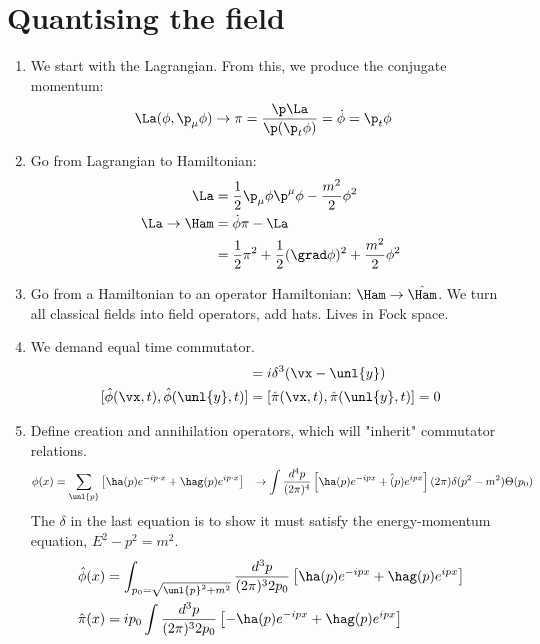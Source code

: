 \documentclass[a4paper, 11pt, normalem]{report}
\newcommand\hphi{\hat{\phi}}
\newcommand\hpi{\hat{\pi}}
\newcommand\vy{\unl{y}}
\begin{document}
\section{Quantising the field}
\begin{enumerate}
    \item We start with the Lagrangian.
        From this, we produce the conjugate momentum:
        \begin{align}
            \La(\phi,\p_\mu\phi) \to \pi &= \frac{\p\La}{\p(\p_t\phi)} = \dot{\phi} = \p_t\phi
        \end{align}
    \item Go from Lagrangian to Hamiltonian:
        \begin{align}
            \La &= \frac12 \p_\mu\phi\p^\mu\phi - \frac{m^2}{2}\phi^2 \\
            \La \to \Ham &= \dot{\phi}\pi - \La \\
                        &= \frac12\pi^2 + \frac12(\grad\phi)^2 + \frac{m^2}{2}\phi^2
        \end{align}
    \item Go from a Hamiltonian to an operator Hamiltonian: $\Ham \to \hat{\Ham}$.
        We turn all classical fields into field operators, add hats.
        Lives in Fock space.
    \item We demand equal time commutator.
        \begin{align}
            [\hphi(\vx,t),\hpi(\vy,t)] &= i\delta^3(\vx-\vy) \\
            [\hphi(\vx,t),\hphi(\vy,t)] &= [\hpi(\vx,t),\hpi(\vy,t)] = 0
        \end{align}
    \item Define creation and annihilation operators, which will "inherit" commutator relations.
        \begin{align}
            \phi(x) &= \sum_{\unl{p}} \left[\ha(p)e^{-ip\cdot x} + \hag(p)e^{ip\cdot x}\right]
                    &\to \int \frac{d^4p}{(2\pi)^4} \left[\ha(p)e^{-ipx} + \hat(p)e^{ipx}\right](2\pi)\delta(p^2-m^2)\Theta(p_0)
        \end{align}
        The $\delta$ in the last equation is to show it must satisfy the energy-momentum equation, $E^2 - p^2 = m^2$.
        \begin{align}
            \hphi(x) &= \int_{p_0=\sqrt{\unl{p}^2+m^2}} \frac{d^3p}{(2\pi)^32p_0} \left[\ha(p)e^{-ipx} + \hag(p)e^{ipx}\right] \\
            \hpi(x) &= ip_0\int \frac{d^3p}{(2\pi)^32p_0} \left[-\ha(p)e^{-ipx} + \hag(p)e^{ipx}\right] \\

\end{align}
\end{enumerate}
\end{document}
